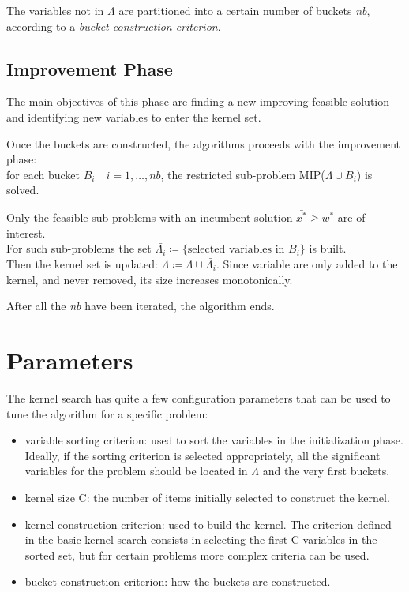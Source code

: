 The variables not in \(\Lambda\) are partitioned into a certain number of buckets \textit{nb}, according
to a \textit{bucket construction criterion}.

\subsection{Improvement Phase}
The main objectives of this phase are finding a new improving feasible solution and identifying new variables
to enter the kernel set.

Once the buckets are constructed, the algorithms proceeds with the improvement phase:\\
for each bucket \(B_{i} \quad i=1,\dots,nb\),
the restricted sub-problem MIP(\(\Lambda \cup B_{i}\)) is solved.

Only the feasible sub-problems with an incumbent solution \(\bar{x^{*}} \geq w^{*}\) are of interest.\\
For such sub-problems the set \(\bar{\Lambda_{i}} \coloneqq \{\text{selected variables in } B_{i}\}\) is built.\\
Then the kernel set is updated: \(\Lambda \coloneqq \Lambda \cup \bar{\Lambda_{i}}\).
Since variable are only added to the kernel, and never removed, its size increases monotonically.

After all the \textit{nb} have been iterated, the algorithm ends.


\section{Parameters}
The kernel search has quite a few configuration parameters that can be used to tune the algorithm for a specific problem:
\begin{itemize}
    \item variable sorting criterion: used to sort the variables in the initialization phase.
    Ideally, if the sorting criterion is selected appropriately,
    all the significant variables for the problem should be located in \(\Lambda\) and the very first buckets.
    \item kernel size C: the number of items initially selected to construct the kernel.
    \item kernel construction criterion: used to build the kernel.
    The criterion defined in the basic kernel search consists in selecting
    the first C variables in the sorted set, but for certain problems more complex criteria can be used.
    \item bucket construction criterion: how the buckets are constructed.
\end{itemize}


